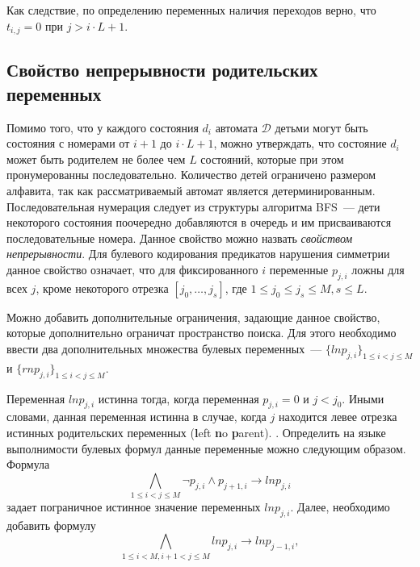 Как следствие, по определению переменных наличия переходов верно, что $t_{i, j} = 0$ при $j > i \cdot L + 1$.



\subsection{Свойство непрерывности родительских переменных}
\label{sec:space:pruning:continuity}

Помимо того, что у каждого состояния $d_{i}$ автомата $\mathcal{D}$ детьми могут быть состояния с номерами от $i + 1$ до $i \cdot L + 1$, можно утверждать, что состояние $d_{i}$ может быть родителем не более чем $L$ состояний, которые при этом пронумерованны последовательно.
Количество детей ограничено размером алфавита, так как рассматриваемый автомат является детерминированным.
Последовательная нумерация следует из структуры алгоритма BFS~{---} дети некоторого состояния поочередно добавляются в очередь и им присваиваются последовательные номера.
Данное свойство можно назвать \emph{свойством непрерывности}.
Для булевого кодирования предикатов нарушения симметрии данное свойство означает, что для фиксированного $i$ переменные $p_{j,i}$ ложны для всех $j$, кроме некоторого отрезка $[j_{0},\ldots,j_{s}]$, где $1 \leq j_{0} \leq j_{s} \leq M, s\leq L$.

Можно добавить дополнительные ограничения, задающие данное свойство, которые дополнительно ограничат пространство поиска.
Для этого необходимо ввести два дополнительных множества булевых переменных~{---} $\{\mathit{lnp}_{j,i}\}_{1 \leq i < j \leq M}$ и  $\{\mathit{rnp}_{j,i}\}_{1 \leq i < j \leq M}$.

Переменная $\mathit{lnp}_{j,i}$ истинна тогда, когда переменная $p_{j,i} = 0$ и $j < j_{0}$.
Иными словами, данная переменная истинна в случае, когда $j$ находится левее отрезка истинных родительских переменных (\textbf{l}eft \textbf{n}o \textbf{p}arent).
.
Определить на языке выполнимости булевых формул данные переменные можно следующим образом.
Формула
\begin{equation*}
\bigwedge_{1 \leq i < j \leq M} \neg p_{j,i} \wedge p_{j + 1, i} \rightarrow \mathit{lnp}_{j,i}
\end{equation*}
задает пограничное истинное значение переменных $\mathit{lnp}_{j,i}$.
Далее, необходимо добавить формулу
\begin{equation*}
\bigwedge_{1 \leq i < M, i + 1 < j \leq M} \mathit{lnp}_{j,i} \rightarrow \mathit{lnp}_{j - 1, i},
\end{equation*}

